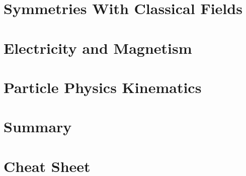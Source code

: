 \section{Symmetries With Classical Fields}

\section{Electricity and Magnetism}

\section{Particle Physics Kinematics}
\section{Summary}
\section{Cheat Sheet}
